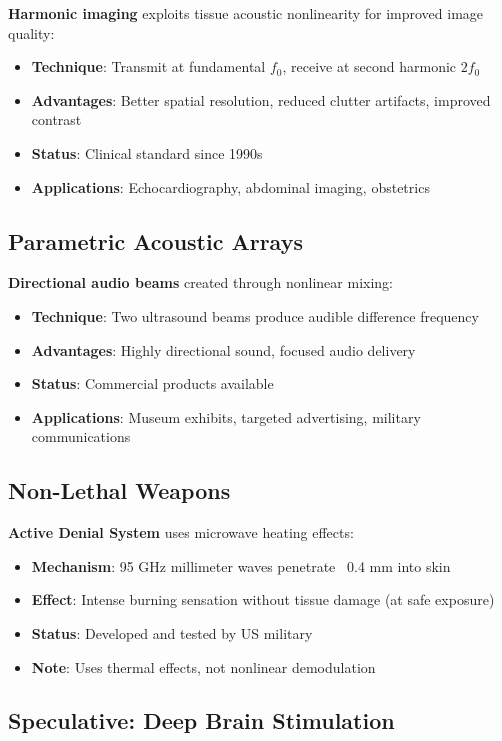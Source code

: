 \textbf{Harmonic imaging} exploits tissue acoustic nonlinearity for improved image quality:
\begin{itemize}
\item \textbf{Technique}: Transmit at fundamental $f_0$, receive at second harmonic $2f_0$
\item \textbf{Advantages}: Better spatial resolution, reduced clutter artifacts, improved contrast
\item \textbf{Status}: Clinical standard since 1990s
\item \textbf{Applications}: Echocardiography, abdominal imaging, obstetrics
\end{itemize}

\subsection{Parametric Acoustic Arrays}

\textbf{Directional audio beams} created through nonlinear mixing:
\begin{itemize}
\item \textbf{Technique}: Two ultrasound beams produce audible difference frequency
\item \textbf{Advantages}: Highly directional sound, focused audio delivery
\item \textbf{Status}: Commercial products available
\item \textbf{Applications}: Museum exhibits, targeted advertising, military communications
\end{itemize}

\subsection{Non-Lethal Weapons}

\textbf{Active Denial System} uses microwave heating effects:
\begin{itemize}
\item \textbf{Mechanism}: 95 GHz millimeter waves penetrate ~0.4 mm into skin
\item \textbf{Effect}: Intense burning sensation without tissue damage (at safe exposure)
\item \textbf{Status}: Developed and tested by US military
\item \textbf{Note}: Uses thermal effects, not nonlinear demodulation
\end{itemize}

\subsection{Speculative: Deep Brain Stimulation}

